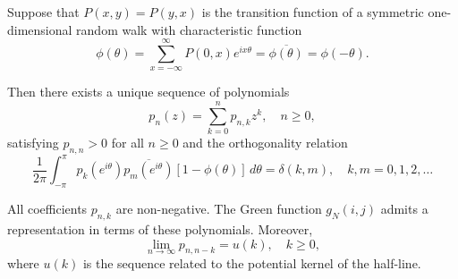 Suppose that $P(x,y) = P(y,x)$ is the transition function of a symmetric one-dimensional random walk with characteristic function
$$\phi(\theta) = \sum_{x=-\infty}^{\infty} P(0,x) e^{ix\theta} = \overline{\phi(\theta)} = \phi(-\theta).$$

Then there exists a unique sequence of polynomials
$$p_n(z) = \sum_{k=0}^{n} p_{n,k} z^k, \quad n \geq 0,$$
satisfying $p_{n,n} > 0$ for all $n \geq 0$ and the orthogonality relation
$$\frac{1}{2\pi} \int_{-\pi}^{\pi} p_k(e^{i\theta}) \overline{p_m(e^{i\theta})} [1 - \phi(\theta)] \, d\theta = \delta(k,m), \quad k,m = 0,1,2,\ldots$$

All coefficients $p_{n,k}$ are non-negative. The Green function $g_N(i,j)$ admits a representation in terms of these polynomials. Moreover,
$$\lim_{n \to \infty} p_{n,n-k} = u(k), \quad k \geq 0,$$
where $u(k)$ is the sequence related to the potential kernel of the half-line.
